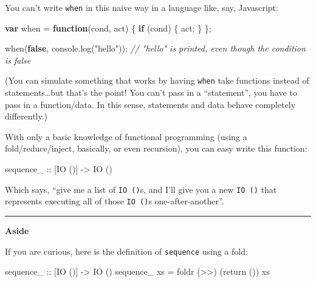 \documentclass[]{article}
\newenvironment{Shaded}{}{}
\newcommand{\KeywordTok}[1]{\textcolor[rgb]{0.00,0.44,0.13}{\textbf{{#1}}}}
\newcommand{\DataTypeTok}[1]{\textcolor[rgb]{0.56,0.13,0.00}{{#1}}}
\newcommand{\StringTok}[1]{\textcolor[rgb]{0.25,0.44,0.63}{{#1}}}
\newcommand{\CommentTok}[1]{\textcolor[rgb]{0.38,0.63,0.69}{\textit{{#1}}}}
\newcommand{\OtherTok}[1]{\textcolor[rgb]{0.00,0.44,0.13}{{#1}}}
\newcommand{\FunctionTok}[1]{\textcolor[rgb]{0.02,0.16,0.49}{{#1}}}
\newcommand{\VariableTok}[1]{\textcolor[rgb]{0.10,0.09,0.49}{{#1}}}
\newcommand{\ControlFlowTok}[1]{\textcolor[rgb]{0.00,0.44,0.13}{\textbf{{#1}}}}
\newcommand{\OperatorTok}[1]{\textcolor[rgb]{0.40,0.40,0.40}{{#1}}}
\newcommand{\AttributeTok}[1]{\textcolor[rgb]{0.49,0.56,0.16}{{#1}}}
\newcommand{\NormalTok}[1]{{#1}}
\begin{document}
You can't write \texttt{when} in this naive way in a language like, say,
Javascript:

\begin{Shaded}
\begin{Highlighting}[]
\KeywordTok{var} \NormalTok{when }\OperatorTok{=} \KeywordTok{function}\NormalTok{(cond}\OperatorTok{,} \NormalTok{act) }\OperatorTok{\{} \ControlFlowTok{if} \NormalTok{(cond) }\OperatorTok{\{} \NormalTok{act}\OperatorTok{;} \OperatorTok{\}} \OperatorTok{\};}

\AttributeTok{when}\NormalTok{(}\KeywordTok{false}\OperatorTok{,} \VariableTok{console}\NormalTok{.}\AttributeTok{log}\NormalTok{(}\StringTok{"hello"}\NormalTok{))}\OperatorTok{;}
\CommentTok{// "hello" is printed, even though the condition is false}
\end{Highlighting}
\end{Shaded}

(You can simulate something that works by having \texttt{when} take functions
instead of statements\ldots{}but that's the point! You can't pass in a
``statement'', you have to pass in a function/data. In this sense, statements
and data behave completely differently.)

With only a basic knowledge of functional programming (using a
fold/reduce/inject, basically, or even recursion), you can easy write this
function:

\begin{Shaded}
\begin{Highlighting}[]
\NormalTok{sequence_}\OtherTok{ ::} \NormalTok{[}\DataTypeTok{IO} \NormalTok{()] }\OtherTok{->} \DataTypeTok{IO} \NormalTok{()}
\end{Highlighting}
\end{Shaded}

Which says, ``give me a list of \texttt{IO\ ()}s, and I'll give you a new
\texttt{IO\ ()} that represents executing all of those \texttt{IO\ ()}s
one-after-another''.

\begin{center}\rule{0.5\linewidth}{\linethickness}\end{center}

\textbf{Aside}

If you are curious, here is the definition of \texttt{sequence} using a fold:

\begin{Shaded}
\begin{Highlighting}[]
\NormalTok{sequence_}\OtherTok{ ::} \NormalTok{[}\DataTypeTok{IO} \NormalTok{()] }\OtherTok{->} \DataTypeTok{IO} \NormalTok{()}
\NormalTok{sequence_ xs }\FunctionTok{=} \NormalTok{foldr (}\FunctionTok{>>}\NormalTok{) (return ()) xs}
\end{Highlighting}
\end{Shaded}
\end{document}
